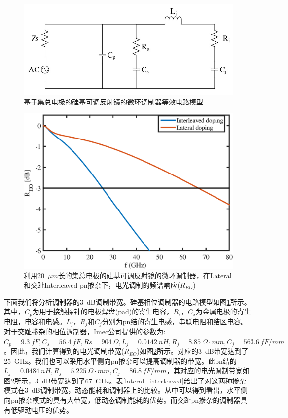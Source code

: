 \begin{figure}[htb]
	\centering
	\includegraphics[width=12cm]{./Pictures/chapt5_tunable_reflection_ring_modulator_equit_circuit.jpg}
	\caption{基于集总电极的硅基可调反射镜的微环调制器等效电路模型}
	\label{chapt5_tunable_reflection_ring_modulator_equit_circuit}
\end{figure}
\begin{figure}[htb]
	\centering
	\includegraphics[width=12cm]{./Pictures/chapt5_bandwidth.eps}
	\caption{利用20~$\mu m$长的集总电极的硅基可调反射镜的微环调制器，在Lateral和交趾Interleaved pn掺杂下，电光调制的频谱响应($R_{EO}$)}
	\label{chapt5_bandwidth}
\end{figure}

下面我们将分析调制器的3~dB调制带宽。硅基相位调制器的电路模型如图\ref{chapt5_tunable_reflection_ring_modulator_equit_circuit}所示。其中，$C_p$为用于接触探针的电极焊盘(pad)的寄生电容，$R_s$，$C_s$为金属电极的寄生电阻，电容和电感。$L_j$，$R_j$和$C_j$分别为pn结的寄生电感，串联电阻和结区电容。对于交趾掺杂的相位调制器，Imec公司\cite{Imec}提供的参数为:$C_p = 9.3~fF, C_s = 56.4~fF, Rs = 904~\Omega, L_j = 0.0142~nH, R_j = 8.85~\Omega\cdot mm, C_j = 563.6~fF/mm$。因此，我们计算得到的电光调制带宽($R_{EO}$)如图\ref{chapt5_bandwidth}所示。对应的3~dB带宽达到了25~GHz。我们也可以采用水平侧向pn掺杂可以提高调制器的带宽。此pn结的$L_j = 0.0484~nH, R_j = 5.225~\Omega\cdot mm, C_j = 86.8~fF/mm$，其对应的电光调制带宽如图\ref{chapt5_bandwidth}所示，3~dB带宽达到了67~GHz。表\ref{lateral_interleaved}给出了对这两种掺杂模式在3~dB调制带宽，动态能耗和调制器上的比较。从中可以得到看出，水平侧向pn掺杂模式的具有大带宽，低动态调制能耗的优势。而交趾pn掺杂的调制器具有低驱动电压的优势。

